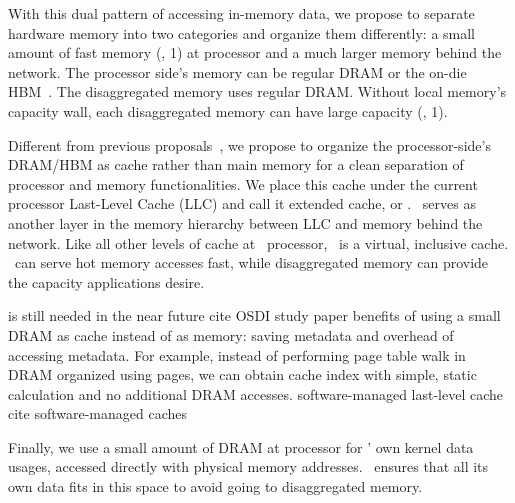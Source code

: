 \documentclass[10pt,times,twocolumn]{z2-article}
\begin{document}
{{{{{{{%
With this dual pattern of accessing in-memory data, we propose to separate hardware memory into two categories and organize them differently:
a small amount of fast memory (\eg, 1\GB) at processor
and a much larger memory behind the network.
The processor side's memory can be regular DRAM 
or the on-die HBM~\cite{HBM-JEDEC,Knights-Landing}. 
The disaggregated memory uses regular DRAM.
Without local memory's capacity wall, each disaggregated memory can have large capacity (\eg, 1\TB).

Different from previous proposals~\cite{Lim09-disaggregate}, 
we propose to organize the processor-side's DRAM/HBM as cache rather than main memory
for a clean separation of processor and memory functionalities.
We place this cache under the current processor Last-Level Cache (LLC)
and call it extended cache, or {\em \excache}.
\excache\ serves as another layer in the memory hierarchy between LLC and memory behind the network.
Like all other levels of cache at \lego\ processor, \excache\ is a virtual, inclusive cache.
\excache\ can serve hot memory accesses fast, while disaggregated memory can provide the capacity applications desire. 

is still needed in the near future
cite OSDI study paper
benefits of using a small DRAM as cache instead of as memory:
saving metadata and overhead of accessing metadata.
For example, instead of performing page table walk in DRAM organized using pages, 
we can obtain cache index with simple, static calculation and no additional DRAM accesses.
software-managed last-level cache
cite software-managed caches
\fi

Finally, we use a small amount of DRAM at processor for \lego{}' own kernel data usages,
accessed directly with physical memory addresses. 
\lego\ ensures that all its own data fits in this space to avoid going to disaggregated memory.

}}}}}}}
\end{document}
